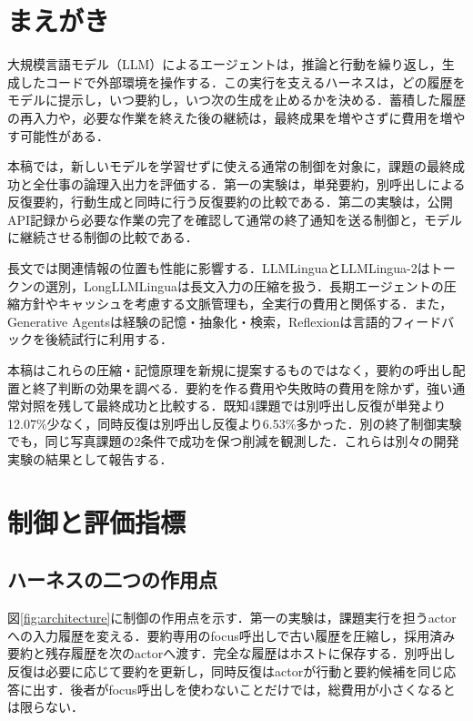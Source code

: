 \documentclass[letter]{ieicej}
\begin{document}
\maketitle


\section{まえがき}
大規模言語モデル（LLM）によるエージェントは，推論と行動を繰り返し\cite{yao2023react}，生成したコードで外部環境を操作する\cite{wang2024codeact}．この実行を支えるハーネスは，どの履歴をモデルに提示し，いつ要約し，いつ次の生成を止めるかを決める．蓄積した履歴の再入力や，必要な作業を終えた後の継続は，最終成果を増やさずに費用を増やす可能性がある．

本稿では，新しいモデルを学習せずに使える通常の制御を対象に，課題の最終成功と全仕事の論理入出力を評価する．第一の実験は，単発要約，別呼出しによる反復要約，行動生成と同時に行う反復要約の比較である．第二の実験は，公開API記録から必要な作業の完了を確認して通常の終了通知を送る制御と，モデルに継続させる制御の比較である．

長文では関連情報の位置も性能に影響する\cite{liu2024lost}．LLMLingua\cite{jiang2023llmlingua}とLLMLingua-2\cite{pan2024llmlingua2}はトークンの選別，LongLLMLingua\cite{jiang2024longllmlingua}は長文入力の圧縮を扱う．長期エージェントの圧縮方針\cite{kang2026acon}やキャッシュを考慮する文脈管理\cite{xu2026tokenpilot}も，全実行の費用と関係する．また，Generative Agents\cite{park2023generative}は経験の記憶・抽象化・検索，Reflexion\cite{shinn2023reflexion}は言語的フィードバックを後続試行に利用する．

本稿はこれらの圧縮・記憶原理を新規に提案するものではなく，要約の呼出し配置と終了判断の効果を調べる．要約を作る費用や失敗時の費用を除かず，強い通常対照を残して最終成功と比較する．既知4課題では別呼出し反復が単発より12.07\%少なく，同時反復は別呼出し反復より6.53\%多かった．別の終了制御実験でも，同じ写真課題の2条件で成功を保つ削減を観測した．これらは別々の開発実験の結果として報告する．

\section{制御と評価指標}
\subsection{ハーネスの二つの作用点}
図\ref{fig:architecture}に制御の作用点を示す．第一の実験は，課題実行を担うactorへの入力履歴を変える．要約専用のfocus呼出しで古い履歴を圧縮し，採用済み要約と残存履歴を次のactorへ渡す．完全な履歴はホストに保存する．別呼出し反復は必要に応じて要約を更新し，同時反復はactorが行動と要約候補を同じ応答に出す．後者がfocus呼出しを使わないことだけでは，総費用が小さくなるとは限らない．
\end{document}
